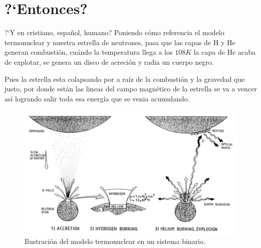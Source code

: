 \documentclass{beamer}
\begin{document}

\section{?`Entonces?}

\begin{frame}{?`Y en cristiano, espa\~nol, humano?}
Poniendo c\'omo referencia el modelo termonuclear y nuestra estrella de neutrones, pasa que
las capas de H y He generan combustión, cu\'ando la temperatura llega a los $10{8}K$ la capa
de He acaba de explotar, se genera un disco de acreci\'on y radia un cuerpo negro.

Pues la estrella esta colapsando por a ra\'iz de la combusti\'on y la gravedad que justo, por
donde est\'an las lineas del campo magn\'etico de la estrella se va a vencer as\'i logrando salir
toda esa energ\'ia que se venia acumulando.
	\begin{figure}
		\centering
		\includegraphics[scale=0.2]{creacionGRB.png}
		\caption{Ilustraci\'on del modelo termonuclear en un sistema binario.}
	\end{figure}
\end{frame}

\end{document}
